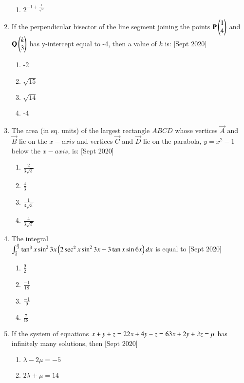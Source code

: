 \documentclass[journal]{IEEEtran}
\begin{document}
\begin{enumerate}
\begin{enumerate}
			\item $2^{-1 + \frac{1}{\sqrt{2}}}$
		\end{enumerate}
	\item
	If the perpendicular bisector of the line segment joining the points $\mathbf{P}\begin{pmatrix}1 \\ 4\end{pmatrix}$ and $\mathbf{Q}\begin{pmatrix}k \\ 3\end{pmatrix}$ has y-intercept equal to -4, then a value of $k$ is:
	\hfill [Sept 2020]
		\begin{enumerate}
			\item -2
			\item $\sqrt{15}$
			\item $\sqrt{14}$
			\item -4
		\end{enumerate}
	\item
	The area (in sq. units) of the largest rectangle $ABCD$ whose vertices $\vec{A}$ and $\vec{B}$ lie on the $x-axis$ and vertices $\vec{C}$ and $\vec{D}$ lie on the parabola, $y = x^{2}-1$ below the $x-axis$, is:
	\hfill [Sept 2020]
		\begin{enumerate}
			\item $\frac{2}{3\sqrt{3}}$
			\item $\frac{4}{3}$
			\item $\frac{1}{3\sqrt{3}}$
			\item $\frac{4}{3\sqrt{3}}$
		\end{enumerate}
	\item
	The integral \\
	$\int_{\frac{\pi}{6}}^{\frac{\pi}{3}} \tan^{3}{x}\sin^{2}{3x}\left(2\sec^{2}{x}\sin^{2}{3x} + 3\tan{x}\sin{6x}\right) dx$ is equal to 
	\hfill [Sept 2020]
		\begin{enumerate}
			\item $\frac{9}{2}$
			\item $\frac{-1}{18}$
			\item $\frac{-1}{9}$
			\item $\frac{7}{18}$
		\end{enumerate}
	\item
	If the system of equations
	$
	x + y + z = 2 \\
	2x + 4y - z = 6 \\
	3x + 2y + \lambda z =\mu \\
	$
	has infinitely many solutions, then
	\hfill [Sept 2020]
		\begin{enumerate}
			\item $\lambda - 2\mu = -5$
			\item $2\lambda + \mu = 14$

\end{enumerate}
\end{enumerate}
\end{document}
